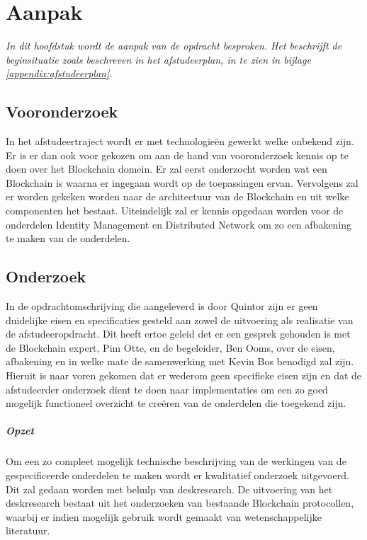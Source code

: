 \chapter{Aanpak}

\textit{In dit hoofdstuk wordt de aanpak van de opdracht besproken. Het beschrijft de beginsituatie zoals beschreven in het afstudeerplan, in te zien in bijlage \ref{appendix:afstudeerplan}.}

\section{Vooronderzoek} In het afstudeertraject wordt er met technologieën gewerkt welke onbekend zijn. Er is er dan ook voor gekozen om aan de hand van vooronderzoek kennis op te doen over het Blockchain domein. Er zal eerst onderzocht worden wat een Blockchain is waarna er ingegaan wordt op de toepassingen ervan. Vervolgens zal er worden gekeken worden naar de architectuur van de Blockchain en uit welke componenten het bestaat. Uiteindelijk zal er kennis opgedaan worden voor de onderdelen Identity Management en Distributed Network om zo een afbakening te maken van de onderdelen.

\section{Onderzoek} In de opdrachtomschrijving die aangeleverd is door Quintor zijn er geen duidelijke eisen en specificaties gesteld aan zowel de uitvoering als realisatie van de afstudeeropdracht. Dit heeft ertoe geleid det er een gesprek gehouden is met de Blockchain expert, Pim Otte, en de begeleider, Ben Ooms, over de eisen, afbakening en in welke mate de samenwerking met Kevin Bos benodigd zal zijn. Hieruit is naar voren gekomen dat er wederom geen specifieke eisen zijn en dat de afstudeerder onderzoek dient te doen naar implementaties om een zo goed mogelijk functioneel overzicht te creëren van de onderdelen die toegekend zijn. 

\paragraph{Opzet} Om een zo compleet mogelijk technische beschrijving van de werkingen van de gespecificeerde onderdelen te maken wordt er kwalitatief onderzoek uitgevoerd. Dit zal gedaan worden met behulp van deskresearch. De uitvoering van het deskresearch bestaat uit het onderzoeken van bestaande Blockchain protocollen, waarbij er indien mogelijk gebruik wordt gemaakt van wetenschappelijke literatuur.


